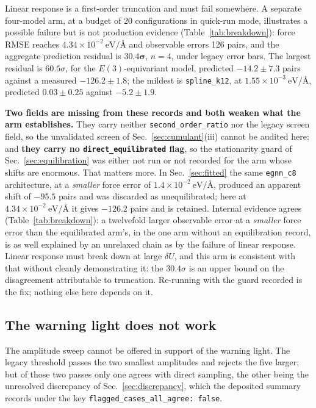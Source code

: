 \documentclass[aip,jcp,reprint,amsmath,amssymb,floatfix]{revtex4-2}
\newcommand{\dU}{\ensuremath{\delta U}}
\newcommand{\eVA}{\ensuremath{\mathrm{eV}/\text{\AA}}}
\begin{document}
Linear response is a first-order truncation and must fail somewhere. A separate
four-model arm, at a budget of 20 configurations in
quick-run mode, illustrates a possible failure but is not production evidence
(Table~\ref{tab:breakdown}): force RMSE reaches $4.34\times10^{-2}~\eVA$
and observable errors 126 pairs, and the aggregate prediction residual is
$\mathbf{30.4\sigma}$, $n = 4$, under legacy error bars. The largest residual is
$60.5\sigma$, for the
$E(3)$-equivariant model, predicted
$-14.2 \pm 7.3$ pairs against a measured $-126.2 \pm 1.8$; the mildest is
\texttt{spline\_k12}, at $1.55\times10^{-3}~\eVA$, predicted $0.03 \pm 0.25$
against $-5.2 \pm 1.9$.

\textbf{Two fields are missing from these records and both weaken what the arm
establishes.} They carry
neither \texttt{second\_order\_ratio} nor the legacy screen field, so the
unvalidated screen of Sec.~\ref{sec:cumulant}(iii) cannot be audited here; and
\textbf{they carry no \texttt{direct\_equilibrated} flag}, so the
stationarity guard of Sec.~\ref{sec:equilibration} was either not run or not
recorded for the arm whose shifts are enormous. That matters more.
In Sec.~\ref{sec:fitted} the same \texttt{egnn\_c8}
architecture, at a \emph{smaller} force error of $1.4\times10^{-2}~\eVA$,
produced an apparent shift of $-95.5$ pairs and was discarded as unequilibrated;
here at $4.34\times10^{-2}~\eVA$ it gives $-126.2$ pairs and is retained. Internal evidence agrees (Table~\ref{tab:breakdown}): a twelvefold
larger observable error at a \emph{smaller} force error than the equilibrated
arm's, in the one arm without an equilibration record, is as well
explained by an unrelaxed chain as by the failure of linear response. Linear
response must break down at large $\dU$, and this arm is consistent with that
without cleanly demonstrating it: the $30.4\sigma$ is an upper
bound on the disagreement attributable to truncation. Re-running with the guard
recorded is the fix; nothing else here depends on it.

\subsection{The warning light does not work}
\label{sec:warninglight}

The amplitude sweep cannot be offered in support of the warning light.
The legacy threshold passes the two smallest amplitudes and rejects the five
larger; but of those two passes only one agrees with direct sampling,
the other being the unresolved discrepancy of
Sec.~\ref{sec:discrepancy}, which the deposited summary records under
the key \texttt{flagged\_cases\_all\_agree: false}.
\end{document}
